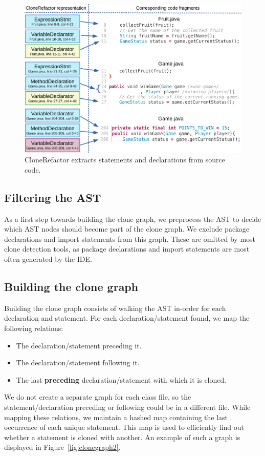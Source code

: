 \documentclass[conference]{IEEEtran}
\begin{document}
\begin{figure}
  \centering
  \includegraphics[width=1\textwidth]{img/CloneGraphCode}
  \caption{CloneRefactor extracts statements and declarations from source code.}
  \label{fig:clonegraph}
\end{figure}

\subsection{Filtering the AST}
As a first step towards building the clone graph, we preprocess the AST to decide which AST nodes should become part of the clone graph. We exclude package declarations and import statements from this graph. These are omitted by most clone detection tools, as package declarations and import statements are most often generated by the IDE.

\subsection{Building the clone graph}\label{sec:buildingclonegraph}
Building the clone graph consists of walking the AST in-order for each declaration and statement. For each declaration/statement found, we map the following relations:
\begin{itemize}
  \item The declaration/statement preceding it.
  \item The declaration/statement following it.
  \item The last \textbf{preceding} declaration/statement with which it is cloned.
\end{itemize}
We do not create a separate graph for each class file, so the statement/declaration preceding or following could be in a different file. While mapping these relations, we maintain a hashed map containing the last occurrence of each unique statement. This map is used to efficiently find out whether a statement is cloned with another. An example of such a graph is displayed in Figure~\ref{fig:clonegraph2}.
\end{document}
